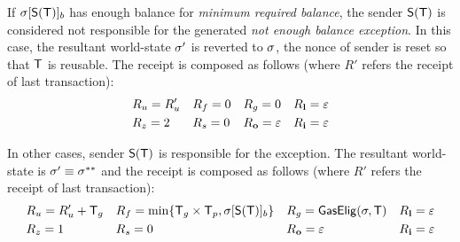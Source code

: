 If $\mathbf{\sigma}[\mathsf{S}{\left({\textsf{T}} \right)}]_b$ has enough balance for \emph{minimum required balance}, the sender $\mathsf{S}{\left({\textsf{T}} \right)}$ is considered not responsible for the generated \emph{not enough balance exception}. 
In this case, the resultant world-state $\mathbf{\sigma}'$ is reverted to $\mathbf{\sigma}$, the nonce of sender is reset so that $\textsf{T}$ is reusable. The receipt is composed as follows (where $R'$ refers the receipt of last transaction):
\begin{align}
	&R_u=R'_u && R_f=0 && R_g=0 && R_{\bf l}=\mathbb{\varepsilon} \\
	&R_z=2 && R_s=0 && R_{\bf o}=\mathbb{\varepsilon} && R_{\bf i}=\mathbb{\varepsilon}
\end{align}

In other cases, sender $\mathsf{S}{\left({\textsf{T}} \right)}$ is responsible for the exception. The resultant world-state is $\mathbf{\sigma}'\equiv \mathbf{\sigma}^{**}$ and the receipt is composed as follows (where $R'$ refers the receipt of last transaction):
\begin{align}
	&R_u=R'_u+\textsf{T}_g && R_f=\min\{\textsf{T}_g\times\textsf{T}_p,\mathbf{\sigma}[\mathsf{S}{\left({\textsf{T}} \right)}]_b\} && R_g=\mathsf{GasElig}(\mathbf{\sigma},\textsf{T}) && R_{\bf l}=\mathbb{\varepsilon} \\
	&R_z=1 && R_s=0 && R_{\bf o}=\mathbb{\varepsilon} && R_{\bf i}=\mathbb{\varepsilon}
\end{align}




%



